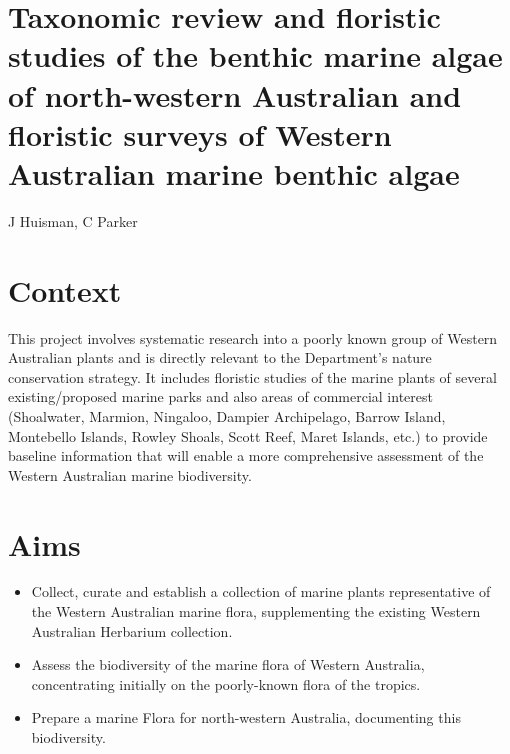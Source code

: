 \documentclass[version=last,
    paper=a4, %
    10pt, %
    usenames,
    dvipsnames,
    oneside, %
    headings=openany, %
    DIV=15 %
]{scrbook}
\begin{document}
\section*{Taxonomic review and floristic studies of the benthic marine algae of
north-western Australian and floristic surveys of Western Australian
marine benthic algae
}

J Huisman, C Parker


\section*{Context}
This project involves systematic research into a poorly known group of
Western Australian plants and is directly relevant to the Department's
nature conservation strategy. It includes floristic studies of the
marine plants of several existing/proposed marine parks and also areas
of commercial interest (Shoalwater, Marmion, Ningaloo, Dampier
Archipelago, Barrow Island, Montebello Islands, Rowley Shoals, Scott
Reef, Maret Islands, etc.) to provide baseline information that will
enable a more comprehensive assessment of the Western Australian marine
biodiversity.



\section*{Aims}
\begin{itemize}
\itemsep1pt\parskip0pt
\item
  Collect, curate and establish a collection of marine plants
  representative of the Western Australian marine flora, supplementing
  the existing Western Australian Herbarium collection.
\item
  Assess the biodiversity of the marine flora of Western Australia,
  concentrating initially on the poorly-known flora of the tropics.
\item
  Prepare a marine Flora for north-western Australia, documenting this
  biodiversity.
\end{itemize}
\end{document}
